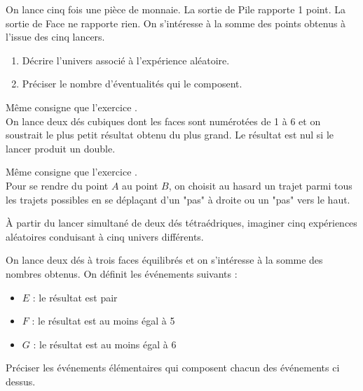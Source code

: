 \begin{exercice}\label{2SP3_E_E1}
     On lance cinq fois une pièce de monnaie. La sortie de Pile rapporte 1 
 point. La sortie de Face ne rapporte rien. On s'intéresse à la somme des
 points obtenus à l'issue des cinq lancers.
 \begin{enumerate}
 \item Décrire l'univers associé à l'expérience aléatoire.
 \item Préciser le nombre d'éventualités qui le composent.
 \end{enumerate}
 \end{exercice}
 \begin{exercice}Même consigne que l'exercice .\\
     On lance deux dés cubiques dont les faces sont numérotées de 1 à 6 et on 
 soustrait le plus petit résultat obtenu du plus grand. Le résultat est
 nul si le lancer produit un double.
 \end{exercice}
 \begin{exercice} Même consigne que l'exercice .\\
 Pour se rendre du point $A$ au point $B$, on choisit au hasard un trajet 
 parmi tous les trajets possibles en se déplaçant d'un "pas" à droite ou
 un "pas" vers le haut.
     \begin{center}    
     \end{center}
 \end{exercice}
 \begin{exercice}
     \`A partir du lancer simultané de deux dés tétraédriques, imaginer cinq 
 expériences aléatoires conduisant à cinq univers différents.
 \end{exercice}
 \begin{exercice}
 On lance deux dés à trois faces équilibrés et on s'intéresse à la somme des 
 nombres obtenus. On définit les événements suivants :
     \begin{itemize}
         \item $E$ : \og le résultat est pair \fg 
         \item $F$ : \og le résultat est au moins égal à 5 \fg
         \item $G$ : \og le résultat est au moins égal à 6 \fg
     \end{itemize}
 Préciser les événements élémentaires qui composent chacun des événements ci 
 dessus.
 \end{exercice}
